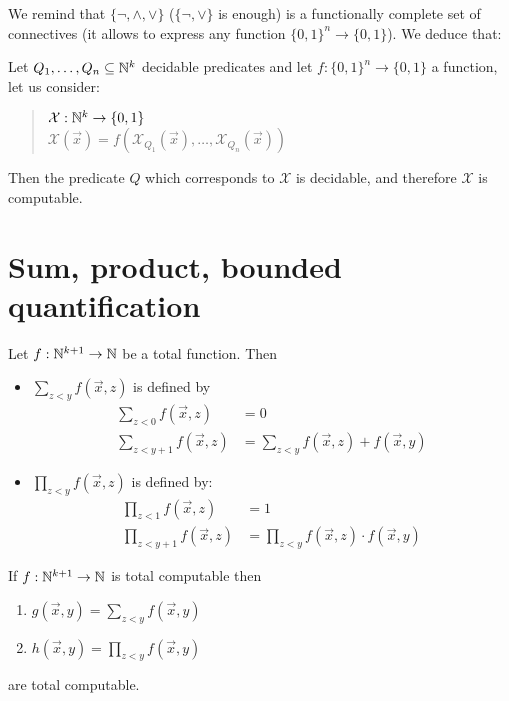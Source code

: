 We remind that $\{\neg, \wedge, \vee \}$ ($\{\neg, \vee \}$ is enough) is a functionally complete set of connectives (it allows to express any function $\{0,1\}^n \rightarrow \{0,1\}$). We deduce that:
\begin{corollary}
  Let $Q_1, \dots, Q_n \subseteq \mathbb{N}^k$ decidable predicates and let $f:\{0,1\}^n \rightarrow \{0,1\}$ a function, let us consider:
  \begin{quote}
    $\mathcal{X}: \mathbb{N}^k\rightarrow\{0,1\}$\\
    $\mathcal{X}(\vec{x}) = f(\mathcal{X}_{Q_1}(\vec{x}), \dots, \mathcal{X}_{Q_n}(\vec{x}) )$
  \end{quote}
  Then the predicate $Q$ which corresponds to $\mathcal{X}$ is
  decidable, and therefore $\mathcal{X}$ is computable.
\end{corollary}

\section{Sum, product, bounded quantification}

\begin{definition}
  Let $f:\mathbb{N}^{k+1}\rightarrow\mathbb{N}$ be a total function. Then
  
  \begin{itemize}
    
  \item 
    $\sum_{z<y}f(\vec{x},z)$ is defined by
    \begin{align*}
      \sum_{z<0}f(\vec{x},z) &= 0 \\
      \sum_{z<y+1}f(\vec{x},z) &= \sum_{z<y}f(\vec{x},z) + f(\vec{x},y)
    \end{align*}
    
    
  \item $\prod_{z<y}f(\vec{x},z)$ is defined by:
    \begin{align*}
      \prod_{z<1}f(\vec{x},z) &= 1 \\
      \prod_{z<y+1}f(\vec{x},z) &= \prod_{z<y}f(\vec{x},z) \cdot f(\vec{x},y)
    \end{align*}
  \end{itemize}
\end{definition}

\begin{lemma}
  If $f:\mathbb{N}^{k+1}\rightarrow\mathbb{N}$ is total computable then
  \begin{enumerate}
  \item $g(\vec{x},y) = \sum_{z<y}f(\vec{x},y)$
  \item $h(\vec{x},y) = \prod_{z<y}f(\vec{x},y)$
  \end{enumerate}
  are total computable.
\end{lemma}

